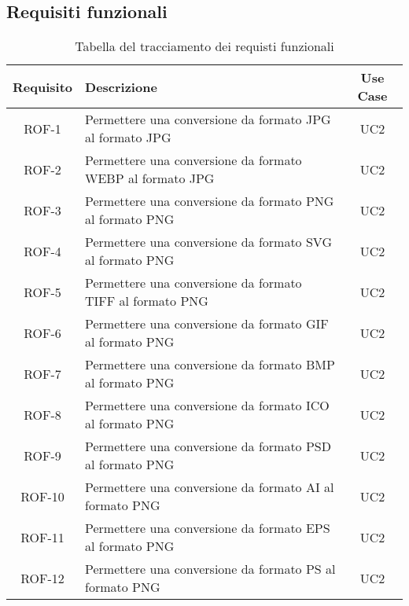 \subsection{Requisiti funzionali}
\begin{table}[H]
    \caption{Tabella del tracciamento dei requisti funzionali}
    \label{tab:requisiti-funzionali}
    \begin{tabularx}{\textwidth}{|c|X|c|}
        \hline
        \textbf{Requisito} & \textbf{Descrizione}                                            & \textbf{Use Case} \\
        \hline
        ROF-1              & Permettere una conversione da formato JPG al
        formato JPG        & UC2
        \\
        \hline
        ROF-2              & Permettere una conversione da formato WEBP al formato JPG       & UC2
        \\
        \hline
        ROF-3              & Permettere una conversione da formato PNG al formato PNG        & UC2
        \\
        \hline
        ROF-4              & Permettere una conversione da formato SVG al formato PNG        & UC2
        \\
        \hline
        ROF-5              & Permettere una conversione da formato TIFF al formato PNG       & UC2
        \\
        \hline
        ROF-6              & Permettere una conversione da formato GIF al formato PNG        & UC2
        \\
        \hline
        ROF-7              & Permettere una conversione da formato BMP al formato PNG        & UC2
        \\
        \hline
        ROF-8              & Permettere una conversione da formato ICO al formato PNG        & UC2
        \\
        \hline
        ROF-9              & Permettere una conversione da formato PSD al formato PNG        & UC2
        \\
        \hline
        ROF-10             & Permettere una conversione da formato AI al formato PNG         & UC2
        \\
        \hline
        ROF-11             & Permettere una conversione da formato EPS al formato PNG        & UC2
        \\
        \hline
        ROF-12             & Permettere una conversione da formato PS al formato PNG         & UC2
        \\
        \hline

\end{tabularx}
\end{table}
